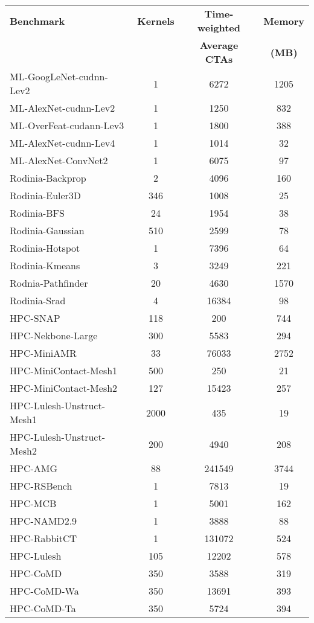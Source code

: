 \begin{table}[t]
\begin{small}
\centering
\begin{tabular}{lccc}
 \toprule
 \textbf{Benchmark} & \textbf{Kernels} & \textbf{Time-weighted} & 
\textbf{Memory} \\
& & \textbf{Average CTAs} & \textbf{(MB)} \\
 \toprule
ML-GoogLeNet-cudnn-Lev2 & 1 & 6272 & 1205 \\
ML-AlexNet-cudnn-Lev2 & 1 & 1250 & 832 \\
ML-OverFeat-cudann-Lev3 & 1 & 1800 & 388 \\
ML-AlexNet-cudnn-Lev4 & 1 & 1014 & 32 \\
ML-AlexNet-ConvNet2 & 1 & 6075 & 97 \\
Rodinia-Backprop & 2 & 4096 & 160 \\
Rodinia-Euler3D & 346 & 1008 & 25 \\
Rodinia-BFS & 24 & 1954 & 38 \\
Rodinia-Gaussian & 510 & 2599 & 78 \\
Rodinia-Hotspot & 1 & 7396 & 64 \\
Rodinia-Kmeans & 3 & 3249 & 221 \\
Rodnia-Pathfinder & 20 & 4630 & 1570 \\
Rodinia-Srad & 4 & 16384 & 98 \\
HPC-SNAP & 118 & 200 & 744 \\
HPC-Nekbone-Large & 300 & 5583 & 294 \\
HPC-MiniAMR & 33 & 76033 & 2752 \\
HPC-MiniContact-Mesh1 & 500 & 250 & 21 \\
HPC-MiniContact-Mesh2 & 127 & 15423 & 257 \\
HPC-Lulesh-Unstruct-Mesh1 & 2000 & 435 & 19 \\
HPC-Lulesh-Unstruct-Mesh2 & 200 & 4940 & 208 \\
HPC-AMG & 88 & 241549 & 3744 \\
HPC-RSBench & 1 & 7813 & 19 \\
HPC-MCB & 1 & 5001 & 162 \\
HPC-NAMD2.9 & 1 & 3888 & 88 \\
HPC-RabbitCT & 1 & 131072 & 524 \\
HPC-Lulesh & 105 & 12202 & 578 \\
HPC-CoMD & 350 & 3588 & 319 \\
HPC-CoMD-Wa & 350 & 13691 & 393 \\
HPC-CoMD-Ta & 350 & 5724 & 394 \\

\end{tabular}
\end{small}
\end{table}
